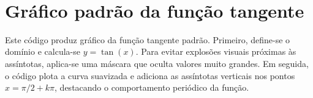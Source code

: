 \documentclass[11pt]{article}
\begin{document}
    \begin{center}
    \end{center}
    { \hspace*{\fill} \\}
    
    \section{Gráfico padrão da função
tangente}\label{gruxe1fico-padruxe3o-da-funuxe7uxe3o-tangente}

Este código produz gráfico da função tangente padrão. Primeiro,
define-se o domínio e calcula-se \(y=\tan(x)\). Para evitar explosões
visuais próximas às assíntotas, aplica-se uma máscara que oculta valores
muito grandes. Em seguida, o código plota a curva suavizada e adiciona
as assíntotas verticais nos pontos \(x=\pi/2 + k\pi\), destacando o
comportamento periódico da função.
\end{document}
